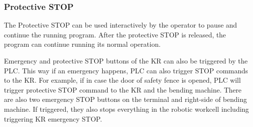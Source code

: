     \subsubsection{Protective STOP}
    The Protective STOP can be used interactively by the operator to pause and continue the running program.
    After the protective STOP is released, the program can continue running its normal operation.

\vspace{1\baselineskip}
Emergency and protective STOP buttons of the KR can also be triggered by the PLC. This way
if an emergency happens, PLC can also trigger STOP commands to the KR. For example, if in
case the door of safety fence is opened, PLC will trigger protective STOP command to the 
KR and the bending machine.
There are also two emergency STOP buttons on the terminal and right-side of bending machine. If triggered,
they also stops everything in the robotic workcell including triggering KR emergency STOP.
